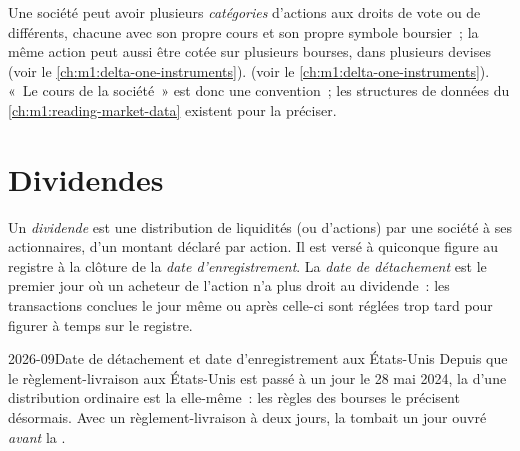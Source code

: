 Une société peut avoir plusieurs \emph{catégories} d'actions aux droits de vote ou
de  différents, chacune avec son propre cours et son propre symbole boursier~; la même action peut
aussi être cotée sur plusieurs bourses, dans plusieurs devises (voir le \cref{ch:m1:delta-one-instruments}).
(voir le \cref{ch:m1:delta-one-instruments}). «~Le cours de la société~» est
donc une convention~; les structures de données du \cref{ch:m1:reading-market-data}
existent pour la préciser.

\section{Dividendes}

\begin{definition}\label{def:m1:shares-corporate-actions-indices:dividend}
Un \emph{dividende} est une distribution de liquidités (ou d'actions) par une
société à ses actionnaires, d'un montant déclaré par action. Il est versé à
quiconque figure au registre à la clôture de la
\emph{date d'enregistrement}. La
\emph{date de détachement} est le premier jour où un
acheteur de l'action n'a plus droit au dividende~: les transactions conclues le jour même ou
après celle-ci sont réglées trop tard pour figurer à temps sur le registre.
\end{definition}

\begin{dated}{2026-09}{Date de détachement et date d'enregistrement aux États-Unis}\label{dat:m1:shares-corporate-actions-indices:exdate}
Depuis que le règlement-livraison aux États-Unis est passé à un jour le 28 mai 2024, la 
d'une distribution ordinaire est la  elle-même~: les règles des bourses
le précisent désormais. Avec un règlement-livraison à deux jours, la  tombait un jour ouvré \emph{avant}
la .
\end{dated}

